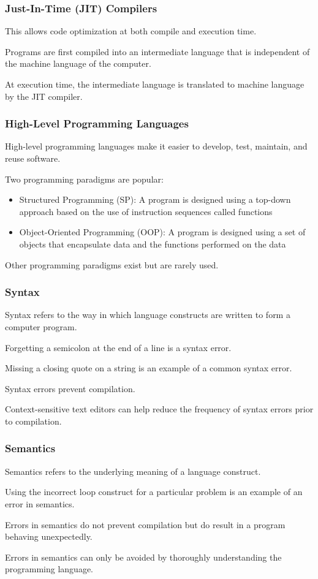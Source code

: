 \begin{frame}
\frametitle{Just-In-Time (JIT) Compilers}
This allows code optimization at both compile and execution time.

Programs are first compiled into an intermediate language that is independent of the machine language of the computer.

At execution time, the intermediate language is translated to machine language by the JIT compiler.

\end{frame}

\begin{frame}
\frametitle{High-Level Programming Languages}

\alert{High-level programming languages} make it easier to develop, test, maintain, and reuse software.

Two programming paradigms are popular:
\begin{itemize}
	\item Structured Programming (SP):  A program is designed using a top-down approach based on the use of instruction sequences called functions
	\item Object-Oriented Programming (OOP):  A program is designed using a set of objects that encapsulate data and the functions performed on the data
\end{itemize}

Other programming paradigms exist but are rarely used.


\end{frame}


\begin{frame}
\frametitle{Syntax}

\alert{Syntax} refers to the way in which language constructs are written to form a computer program.

Forgetting a semicolon at the end of a line is a syntax error.

Missing a closing quote on a string is an example of a common syntax error.

Syntax errors prevent compilation.

Context-sensitive text editors can help reduce the frequency of syntax errors prior to compilation.

\end{frame}

\begin{frame}
\frametitle{Semantics}

\alert{Semantics} refers to the underlying meaning of a language construct.

Using the incorrect loop construct for a particular problem is an example of an error in semantics.

Errors in semantics do not prevent compilation but do result in a program behaving unexpectedly.

Errors in semantics can only be avoided by thoroughly understanding the programming language.

\end{frame}

